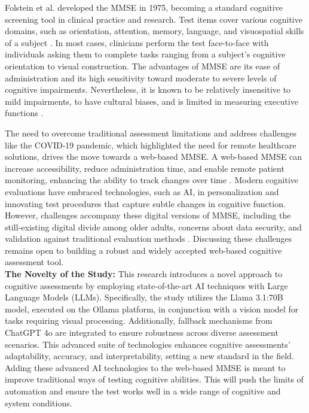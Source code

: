 Folstein et al. \cite{Folstein1975} developed the MMSE in 1975, becoming a standard cognitive screening tool in clinical practice and research. Test items cover various cognitive domains, such as orientation, attention, memory, language, and visuospatial skills of a subject \cite{Folstein1975, Tombaugh1992, Shulman2006}. In most cases, clinicians perform the test face-to-face with individuals asking them to complete tasks ranging from a subject's cognitive orientation to visual construction. The advantages of MMSE are its ease of administration and its high sensitivity toward moderate to severe levels of cognitive impairments. Nevertheless, it is known to be relatively insensitive to mild impairments, to have cultural biases, and is limited in measuring executive functions \cite{Folstein1975}.

The need to overcome traditional assessment limitations and address challenges like the COVID-19 pandemic, which highlighted the need for remote healthcare solutions, drives the move towards a web-based MMSE. A web-based MMSE can increase accessibility, reduce administration time, and enable remote patient monitoring, enhancing the ability to track changes over time \cite{Bauer2012, Seifan2015, Zygouris2017, Geddes2020, Cullum2014, Lim2020, Harrington2021}. Modern cognitive evaluations have embraced technologies, such as AI, in personalization and innovating test procedures that capture subtle changes in cognitive function. However, challenges accompany these digital versions of MMSE, including the still-existing digital divide among older adults, concerns about data security, and validation against traditional evaluation methods \cite{Bilder2020, Wild2021}. Discussing these challenges remains open to building a robust and widely accepted web-based cognitive assessment tool.\\

\noindent\textbf{The Novelty of the Study:} This research introduces a novel approach to cognitive assessments by employing state-of-the-art AI techniques with Large Language Models (LLMs). Specifically, the study utilizes the Llama 3.1:70B model, executed on the Ollama platform, in conjunction with a vision model for tasks requiring visual processing. Additionally, fallback mechanisms from ChatGPT 4o are integrated to ensure robustness across diverse assessment scenarios. This advanced suite of technologies enhances cognitive assessments' adaptability, accuracy, and interpretability, setting a new standard in the field. Adding these advanced AI technologies to the web-based MMSE is meant to improve traditional ways of testing cognitive abilities. This will push the limits of automation and ensure the test works well in a wide range of cognitive and system conditions.

